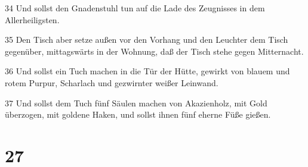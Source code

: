 \par 34 Und sollst den Gnadenstuhl tun auf die Lade des Zeugnisses in dem Allerheiligsten.
\par 35 Den Tisch aber setze außen vor den Vorhang und den Leuchter dem Tisch gegenüber, mittagswärts in der Wohnung, daß der Tisch stehe gegen Mitternacht.
\par 36 Und sollst ein Tuch machen in die Tür der Hütte, gewirkt von blauem und rotem Purpur, Scharlach und gezwirnter weißer Leinwand.
\par 37 Und sollst dem Tuch fünf Säulen machen von Akazienholz, mit Gold überzogen, mit goldene Haken, und sollst ihnen fünf eherne Füße gießen.

\chapter{27}

